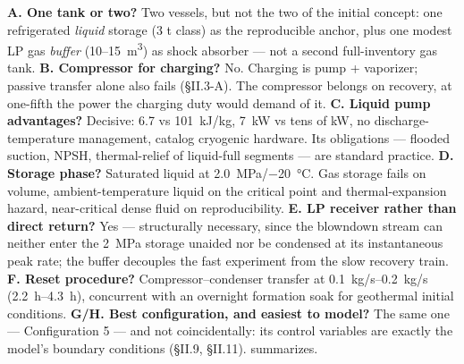\textbf{A. One tank or two?} Two vessels, but not the two of the
initial concept: one refrigerated \emph{liquid} storage
(3 t class) as the reproducible anchor, plus one modest LP gas
\emph{buffer} (10--\SI{15}{m^3}) as shock absorber --- not a second
full-inventory gas tank.
\textbf{B. Compressor for charging?} No. Charging is pump +
vaporizer; passive transfer alone also fails (\S II.3-A). The
compressor belongs on recovery, at one-fifth the power the charging
duty would demand of it.
\textbf{C. Liquid pump advantages?} Decisive: \SI{6.7}{} vs
\SI{101}{kJ/kg}, \SI{7}{kW} vs tens of kW, no discharge-temperature
management, catalog cryogenic hardware. Its obligations ---
flooded suction, NPSH, thermal-relief of liquid-full segments --- are
standard practice.
\textbf{D. Storage phase?} Saturated liquid at
\SI{2.0}{MPa}/\SI{-20}{\celsius}. Gas storage fails on volume,
ambient-temperature liquid on the critical point and
thermal-expansion hazard, near-critical dense fluid on
reproducibility.
\textbf{E. LP receiver rather than direct return?} Yes ---
structurally necessary, since the blowndown stream can neither enter
the \SI{2}{MPa} storage unaided nor be condensed at its instantaneous
peak rate; the buffer decouples the fast experiment from the slow
recovery train.
\textbf{F. Reset procedure?} Compressor--condenser transfer at
\SIrange{0.1}{0.2}{kg/s} (\SIrange{2.2}{4.3}{h}), concurrent with an
overnight formation soak for geothermal initial conditions.
\textbf{G/H. Best configuration, and easiest to model?} The same one
--- Configuration 5 --- and not coincidentally: its control variables
are exactly the model's boundary conditions (\S II.9, \S II.11).
 summarizes.

